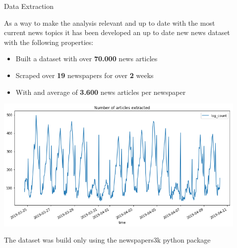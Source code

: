 \documentclass[final,8pt]{beamer} %
\newlength{\sepwid}
\newlength{\onecolwid}
\begin{document}
\begin{frame}[t]
\begin{columns}[t]
\begin{column}{\onecolwid}

\end{column} %

\begin{column}{\sepwid}\end{column} %

\begin{column}{\onecolwid} %



\begin{block}{Data Extraction}

    As a way to make the analysis relevant and up to date with the most current news topics
    it has been developed an up to date new news dataset with the following properties:
    
    \begin{itemize}
        \item Built a dataset with over \textbf{70.000} news articles
        \item Scraped over \textbf{19} newspapers for over \textbf{2} weeks
        \item With and average of \textbf{3.600} news articles per newspaper
    \end{itemize}
    
    \hfill\includegraphics{log_extraction.png}\hspace*{\fill}
    
    The dataset was build only using the newspapers3k python package
    

\end{block}
\end{column}
\end{columns}
\end{frame}
\end{document}
